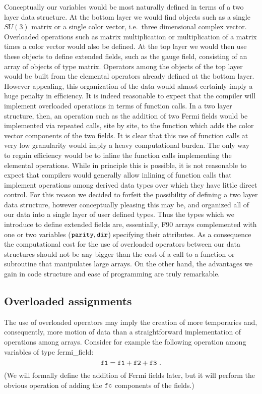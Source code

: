 Conceptually our variables would be most naturally defined in terms of
a two layer data structure.  At the bottom layer we would find objects
such as a single $SU(3)$ matrix or a single color vector, i.e.~three
dimensional complex vector.  Overloaded operations such as matrix 
multiplication or multiplication of a matrix times a color vector
would also be defined. At the top layer we would then use these
objects to define extended fields, such as the gauge field, consisting
of an array of objects of type matrix.  Operators among the objects 
of the top layer would be built from the elemental operators
already defined at the bottom layer. However appealing, this organization 
of the data would almost certainly imply a huge penalty in efficiency.
It is indeed reasonable to expect that the compiler will implement
overloaded operations in terms of function calls.  In a two layer
structure, then, an operation such as the addition of two Fermi
fields would be implemented via repeated calls, site by site, to 
the function which adds the color vector components of the two
fields.  It is clear that this use of function calls
at very low granularity would imply a heavy computational burden.
The only way to regain efficiency would be to inline the function
calls implementing the elemental operations.  While in principle
this is possible, it is not reasonable to expect that compilers
would generally allow inlining of function calls that implement operations
among derived data types over which they have little direct control.
For this reason we decided to forfeit the possibility of defining
a two layer data structure, however conceptually pleasing this
may be, and 
organized all of our data into a single layer of user defined types.
Thus the types which we introduce to define
extended fields are, essentially, F90 arrays complemented with one
or two variables ($\tt parity, dir$) specifying their attributes. 
As a consequence the computational cost for the use of overloaded 
operators between our data structures should not be any bigger than
the cost of a call to a function or subroutine that manipulates large
arrays.  On the other hand, the advantages we gain in code structure
and ease of programming are truly remarkable.

\subsection{Overloaded assignments}
\label{overloaded}

The use of overloaded operators may imply the creation of more 
temporaries and, consequently, more motion of data than a straightforward
implementation of operations among arrays.  Consider for example the
following operation among variables of type fermi\_field:
%
\begin{equation}
\tt f1=f1+f2+f3 \ .
\label{addfff}
\end{equation}
%
(We will formally define the addition of Fermi fields later, but it
will perform the  obvious operation of adding the $\tt fc$ components
of the fields.)


